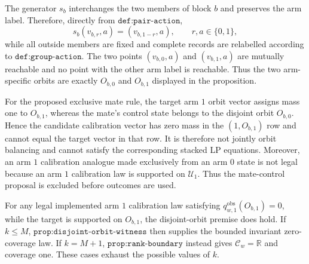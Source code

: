 The generator \(s_b\) interchanges the two members of block \(b\) and preserves the arm label. Therefore, directly from \(\texttt{def:pair-action}\), \[s_b(v_{b,r},a)=(v_{b,1-r},a),\qquad r,a\in\{0,1\},\] while all outside members are fixed and complete records are relabelled according to \(\texttt{def:group-action}\). The two points \((v_{b,0},a)\) and \((v_{b,1},a)\) are mutually reachable and no point with the other arm label is reachable. Thus the two arm-specific orbits are exactly \(O_{b,0}\) and \(O_{b,1}\) displayed in the proposition.

For the proposed exclusive mate rule, the target arm \(1\) orbit vector assigns mass one to \(O_{b,1}\), whereas the mate's control state belongs to the disjoint orbit \(O_{b,0}\). Hence the candidate calibration vector has zero mass in the \((1,O_{b,1})\) row and cannot equal the target vector in that row. It is therefore not jointly orbit balancing and cannot satisfy the corresponding stacked LP equations. Moreover, an arm \(1\) calibration analogue made exclusively from an arm \(0\) state is not legal because an arm \(1\) calibration law is supported on \(\mathcal U_1\). Thus the mate-control proposal is excluded before outcomes are used.

For any legal implemented arm \(1\) calibration law satisfying \(q^{\mathrm{obs}}_{w,1}(O_{b,1})=0\), while the target is supported on \(O_{b,1}\), the disjoint-orbit premise does hold. If \(k\le M\), \(\texttt{prop:disjoint-orbit-witness}\) then supplies the bounded invariant zero-coverage law. If \(k=M+1\), \(\texttt{prop:rank-boundary}\) instead gives \(\mathcal C_w=\mathbb R\) and coverage one. These cases exhaust the possible values of \(k\).